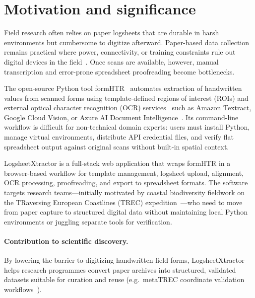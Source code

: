 \documentclass[preprint,12pt,a4paper]{elsarticle}
\begin{document}
\section{Motivation and significance}
\label{sec:motivation}

Field research often relies on paper logsheets that are durable in harsh environments but cumbersome to digitize afterward.
Paper-based data collection remains practical where power, connectivity, or training constraints rule out digital devices in the field~\cite{walther11,VANTAMELEN2004123,BREWER2016131}.
Once scans are available, however, manual transcription and error-prone spreadsheet proofreading become bottlenecks.

The open-source Python tool formHTR~\cite{formHTR_repo} automates extraction of handwritten values from scanned forms using template-defined regions of interest (ROIs) and external optical character recognition (OCR) services~\cite{ocr156468} such as Amazon Textract, Google Cloud Vision, or Azure AI Document Intelligence~\cite{amazon_textract,google_vision_api,azure_form_recognizer}.
Its command-line workflow is difficult for non-technical domain experts: users must install Python, manage virtual environments, distribute API credential files, and verify flat spreadsheet output against original scans without built-in spatial context.

LogsheetXtractor is a full-stack web application that wraps formHTR in a browser-based workflow for template management, logsheet upload, alignment, OCR processing, proofreading, and export to spreadsheet formats.
The software targets research teams---initially motivated by coastal biodiversity fieldwork on the TRaversing European Coastlines (TREC) expedition~\cite{embl_trec}---who need to move from paper capture to structured digital data without maintaining local Python environments or juggling separate tools for verification.

\paragraph{Contribution to scientific discovery.}
By lowering the barrier to digitizing handwritten field forms, LogsheetXtractor helps research programmes convert paper archives into structured, validated datasets suitable for curation and reuse (e.g.\ metaTREC coordinate validation workflows~\cite{metaTREC_curation}).
\end{document}
